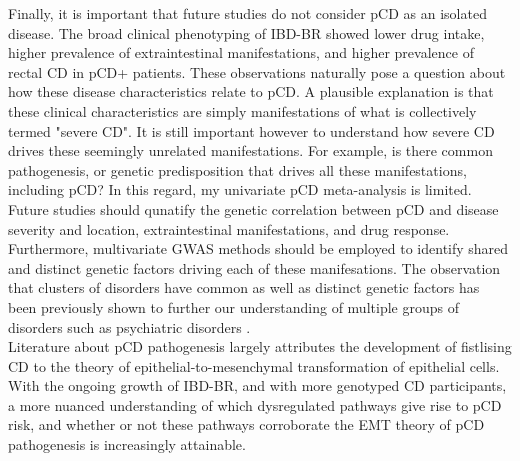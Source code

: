 Finally, it is important that future studies do not consider pCD as an isolated disease. The broad clinical phenotyping of IBD-BR showed lower drug intake, higher prevalence of extraintestinal manifestations, and higher prevalence of rectal CD in pCD+ patients. These observations naturally pose a question about how these disease characteristics relate to pCD. A plausible explanation is that these clinical characteristics are simply manifestations of what is collectively termed "severe CD". It is still important however to understand how severe CD drives these seemingly unrelated manifestations. For example, is there common pathogenesis, or genetic predisposition that drives all these manifestations, including pCD? In this regard, my univariate pCD meta-analysis is limited. Future studies should qunatify the genetic correlation between pCD and disease severity and location, extraintestinal manifestations, and drug response. Furthermore, multivariate GWAS methods should be employed to identify shared and distinct genetic factors driving each of these manifesations. The observation that clusters of disorders have common as well as distinct genetic factors has been previously shown to further our understanding of multiple groups of disorders such as psychiatric disorders \cite{Grotzinger2019-bt}. \\





Literature about pCD pathogenesis largely attributes the development of fistlising CD to the theory of epithelial-to-mesenchymal transformation of epithelial cells. With the ongoing growth of IBD-BR, and with more genotyped CD participants, a more nuanced understanding of which dysregulated pathways give rise to pCD risk, and whether or not these pathways corroborate the EMT theory of pCD pathogenesis is increasingly attainable.





